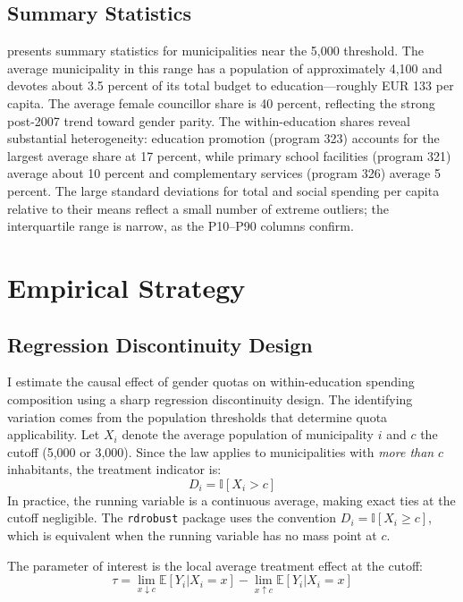 \documentclass[12pt]{article}
\newcommand{\E}{\mathbb{E}}
\newcommand{\ind}{\mathbb{I}}
\begin{document}
\subsection{Summary Statistics}

 presents summary statistics for municipalities near the 5,000 threshold. The average municipality in this range has a population of approximately 4,100 and devotes about 3.5 percent of its total budget to education---roughly EUR 133 per capita. The average female councillor share is 40 percent, reflecting the strong post-2007 trend toward gender parity. The within-education shares reveal substantial heterogeneity: education promotion (program 323) accounts for the largest average share at 17 percent, while primary school facilities (program 321) average about 10 percent and complementary services (program 326) average 5 percent. The large standard deviations for total and social spending per capita relative to their means reflect a small number of extreme outliers; the interquartile range is narrow, as the P10--P90 columns confirm.




\section{Empirical Strategy}

\subsection{Regression Discontinuity Design}

I estimate the causal effect of gender quotas on within-education spending composition using a sharp regression discontinuity design. The identifying variation comes from the population thresholds that determine quota applicability. Let $X_i$ denote the average population of municipality $i$ and $c$ the cutoff (5,000 or 3,000). Since the law applies to municipalities with \emph{more than} $c$ inhabitants, the treatment indicator is:
\begin{equation}
    D_i = \ind[X_i > c]
\end{equation}
In practice, the running variable is a continuous average, making exact ties at the cutoff negligible. The \texttt{rdrobust} package uses the convention $D_i = \ind[X_i \geq c]$, which is equivalent when the running variable has no mass point at $c$.

The parameter of interest is the local average treatment effect at the cutoff:
\begin{equation}
    \tau = \lim_{x \downarrow c} \E[Y_i | X_i = x] - \lim_{x \uparrow c} \E[Y_i | X_i = x]
\end{equation}
\end{document}

